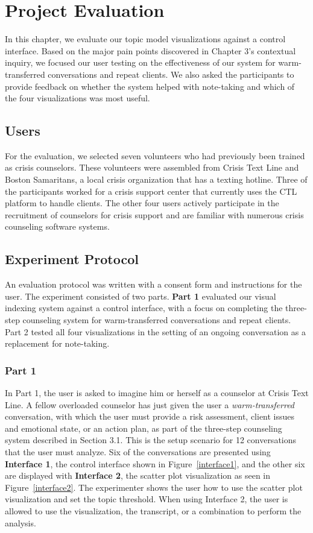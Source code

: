 \chapter{Project Evaluation}

In this chapter, we evaluate our topic model visualizations against a control interface. Based on the major pain points discovered in Chapter 3's contextual inquiry, we focused our user testing on the effectiveness of our system for warm-transferred conversations and repeat clients. We also asked the participants to provide feedback on whether the system helped with note-taking and which of the four visualizations was most useful.

\section{Users}

For the evaluation, we selected seven volunteers who had previously been trained as crisis counselors. These volunteers were assembled from Crisis Text Line and Boston Samaritans, a local crisis organization that has a texting hotline. Three of the participants worked for a crisis support center that currently uses the CTL platform to handle clients. The other four users actively participate in the recruitment of counselors for crisis support and are familiar with numerous crisis counseling software systems.

\section{Experiment Protocol}

An evaluation protocol was written with a consent form and instructions for the user. The experiment consisted of two parts. \textbf{Part 1} evaluated our visual indexing system against a control interface, with a focus on completing the three-step counseling system for warm-transferred conversations and repeat clients. Part 2 tested all four visualizations in the setting of an ongoing conversation as a replacement for note-taking.

\subsection{Part 1}

In Part 1, the user is asked to imagine him or herself as a counselor at Crisis Text Line. A fellow overloaded counselor has just given the user a \textit{warm-transferred} conversation, with which the user must provide a risk assessment, client issues and emotional state, or an action plan, as part of the three-step counseling system described in Section 3.1. This is the setup scenario for 12 conversations that the user must analyze. Six of the conversations are presented using \textbf{Interface 1}, the control interface shown in Figure~\ref{interface1}, and the other six are displayed with \textbf{Interface 2}, the scatter plot visualization as seen in Figure~\ref{interface2}. The experimenter shows the user how to use the scatter plot visualization and set the topic threshold. When using Interface 2, the user is allowed to use the visualization, the transcript, or a combination to perform the analysis.


